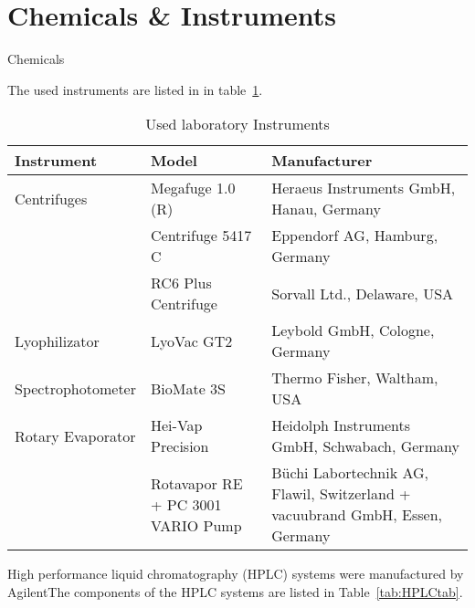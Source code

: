 \section{Chemicals \& Instruments} %
\label{sec:chemicals_&_instruments}

Chemicals

The used instruments are listed in in table~\ref{tab:labins}.

\begin{table}[H]
	\caption{Used laboratory Instruments}
	\label{tab:labins}
	\centering
	\begin{tabularx}{\textwidth}{XXX}
		\textbf{Instrument}			& \textbf{Model}		& \textbf{Manufacturer}	\\
		\midrule
		Centrifuges			&	Megafuge 1.0 (R)		&	Heraeus Instruments GmbH, Hanau, Germany	\\
							&	Centrifuge 5417 C 		&	Eppendorf AG, Hamburg, Germany				\\
							&	RC6 Plus Centrifuge 	&	Sorvall Ltd., Delaware, USA					\\
		Lyophilizator		&	LyoVac GT2				&	Leybold GmbH, Cologne, Germany				\\
		Spectrophotometer	&	BioMate 3S				&	Thermo Fisher, Waltham, USA					\\
		Rotary Evaporator	&	Hei-Vap Precision		&	Heidolph Instruments GmbH, Schwabach, Germany	\\
							&	Rotavapor RE + PC 3001 VARIO Pump	&	Büchi Labortechnik AG, Flawil, Switzerland + vacuubrand GmbH, Essen, Germany \\

		\bottomrule
	\end{tabularx}
\end{table}

High performance liquid chromatography (HPLC) systems were manufactured by AgilentThe components of the HPLC systems are listed in Table~\ref{tab:HPLCtab}.


